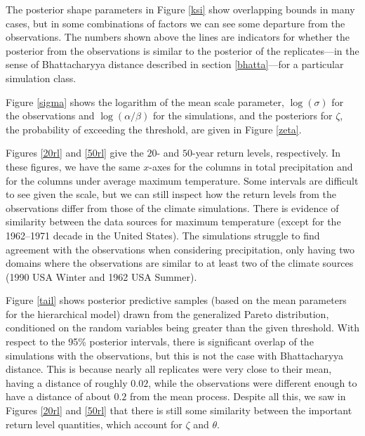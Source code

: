 The posterior shape parameters in Figure \ref{ksi} show overlapping bounds in many cases, but in some combinations of factors we can see some departure from the observations. The numbers shown above the lines are indicators for whether the posterior from the observations is similar to the posterior of the replicates---in the sense of Bhattacharyya distance described in section \ref{bhatta}---for a particular simulation class.

Figure \ref{sigma} shows the logarithm of the mean scale parameter, $\log(\sigma)$ for the observations and $\log(\alpha/\beta)$ for the simulations, and the posteriors for $\zeta$, the probability of exceeding the threshold, are given in Figure \ref{zeta}.

Figures \ref{20rl} and \ref{50rl} give the $20$- and $50$-year return levels, respectively. In these figures, we have the same $x$-axes for the columns in total precipitation and for the columns under average maximum temperature. Some intervals are difficult to see given the scale, but we can still inspect how the return levels from the observations differ from those of the climate simulations. There is evidence of similarity between the data sources for maximum temperature (except for the 1962--1971 decade in the United States). The simulations struggle to find agreement with the observations when considering precipitation, only having two domains where the observations are similar to at least two of the climate sources (1990 USA Winter and 1962 USA Summer).

Figure \ref{tail} shows posterior predictive samples (based on the mean parameters for the hierarchical model) drawn from the generalized Pareto distribution, conditioned on the random variables being greater than the given threshold. With respect to the 95\% posterior intervals, there is significant overlap of the simulations with the observations, but this is not the case with Bhattacharyya distance. This is because nearly all replicates were very close to their mean, having a distance of roughly $0.02$, while the observations were different enough to have a distance of about $0.2$ from the mean process. Despite all this, we saw in Figures \ref{20rl} and \ref{50rl} that there is still some similarity between the important return level quantities, which account for $\zeta$ and $\theta$.

